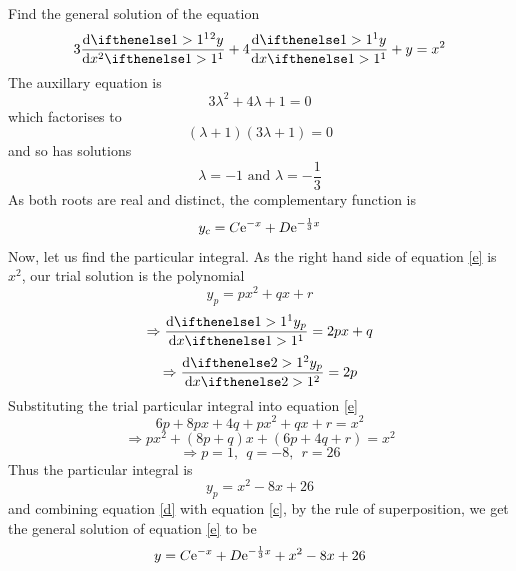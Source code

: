 \documentclass[a4paper,12pt]{article}
\begin{document}
\begin{question}[3]
Find the general solution of the equation
\begin{equation}
\label{e}
3\deriv{^2y}{x^2}+4\deriv{y}{x}+y=x^2
\end{equation}
The auxillary equation is
\begin{equation}
3\lambda^2+4\lambda+1=0
\end{equation}
which factorises to
\begin{equation}
(\lambda+1)(3\lambda+1)=0
\end{equation}
and so has solutions
\begin{equation}
\lambda=-1 \mbox{\ and\ }\lambda=-\frac{1}{3}
\end{equation}
As both roots are real and distinct, the complementary function is
\begin{equation}
\label{d}
y_c=C\mathrm{e}^{-x}+D\mathrm{e}^{-\frac{1}{3}x}
\end{equation}
Now, let us find the particular integral.  As the right hand side of equation \ref{e} is $x^2$, our trial solution is the polynomial
\begin{equation}
y_p=px^2+qx+r
\end{equation}
\begin{equation}
\Rightarrow \deriv{y_p}{x}=2px+q
\end{equation}
\begin{equation}
\Rightarrow \deriv[2]{y_p}{x}=2p
\end{equation}
Substituting the trial particular integral into equation \ref{e}
\begin{equation}
6p+8px+4q+px^2+qx+r=x^2
\end{equation}
\begin{equation}
\Rightarrow px^2+(8p+q)x+(6p+4q+r)=x^2
\end{equation}
\begin{equation}
\Rightarrow p=1,\ \ q=-8,\ \ r=26
\end{equation}
Thus the particular integral is
\begin{equation}
\label{c}
y_p=x^2-8x+26
\end{equation}
and combining equation \ref{d} with equation \ref{c}, by the rule of superposition, we get the general solution of equation \ref{e} to be
\begin{equation}
y=C\mathrm{e}^{-x}+D\mathrm{e}^{-\frac{1}{3}x}+x^2-8x+26
\end{equation}

\end{question}

\end{document}
